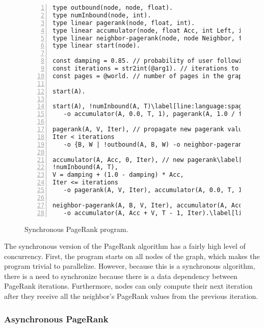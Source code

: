 \begin{figure}[h!]
\begin{Verbatim}[numbers=left,fontsize=\codesize,commandchars=\\\[\]]
type outbound(node, node, float).
type numInbound(node, int).
type linear pagerank(node, float, int).
type linear accumulator(node, float Acc, int Left, int Iteration).
type linear neighbor-pagerank(node, node Neighbor, float Rank, int Iteration).
type linear start(node).

const damping = 0.85. // probability of user following a link in the current page.\label[line:language:spagerank_const1]
const iterations = str2int(@arg1). // iterations to compute.
const pages = @world. // number of pages in the graph.\label[line:language:spagerank_const2]

start(A).

start(A), !numInbound(A, T)\label[line:language:spagerank_first1]
   -o accumulator(A, 0.0, T, 1), pagerank(A, 1.0 / float(pages), 0).\label[line:language:spagerank_first2]

pagerank(A, V, Iter), // propagate new pagerank value\label[line:language:spagerank_second1]
Iter < iterations
   -o {B, W | !outbound(A, B, W) -o neighbor-pagerank(B, A, V * W, Iter + 1)}.\label[line:language:spagerank_second2]

accumulator(A, Acc, 0, Iter), // new pagerank\label[line:language:spagerank_third1]
!numInbound(A, T),
V = damping + (1.0 - damping) * Acc,
Iter <= iterations
   -o pagerank(A, V, Iter), accumulator(A, 0.0, T, Iter + 1).\label[line:language:spagerank_third2]
	
neighbor-pagerank(A, B, V, Iter), accumulator(A, Acc, T, Iter)\label[line:language:spagerank_fourth1]
   -o accumulator(A, Acc + V, T - 1, Iter).\label[line:language:spagerank_fourth2]
\end{Verbatim}
\caption{Synchronous PageRank program.}
\label{language:code:pagerank}
\end{figure}

The synchronous version of the PageRank algorithm has a fairly high level of
concurrency. First, the program starts on all nodes of the graph, which makes
the program trivial to parallelize. However, because this is a synchronous
algorithm, there is a need to synchronize because there is a data dependency
between PageRank iterations. Furthermore, nodes can only compute their next
iteration after they receive all the neighbor's PageRank values from the
previous iteration.

\subsubsection{Asynchronous PageRank}


